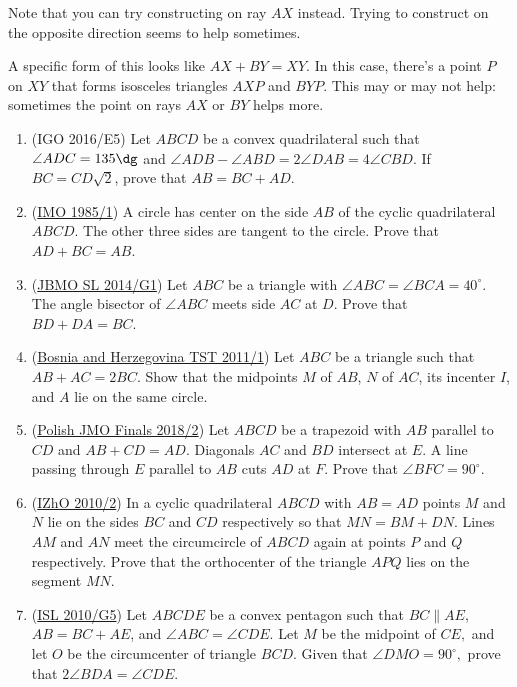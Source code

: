 \documentclass[11pt,paper=letter]{scrartcl}
\begin{document}
Note that you can try constructing on ray $AX$ instead. Trying to construct on the opposite direction seems to help sometimes.

A specific form of this looks like $AX + BY = XY$. In this case, there's a point $P$ on $XY$ that forms isosceles triangles $AXP$ and $BYP$. This may or may not help: sometimes the point on rays $AX$ or $BY$ helps more.

\begin{enumerate}
  \item (IGO 2016/E5) Let $ABCD$ be a convex quadrilateral such that $\angle ADC = 135\dg$ and $\angle ADB - \angle ABD = 2\angle DAB = 4\angle CBD$. If $BC = CD\sqrt2$, prove that $AB = BC + AD$.

  \item (\href{https://aops.com/community/c6h60782}{IMO 1985/1}) A circle has center on the side $AB$ of the cyclic quadrilateral $ABCD$. The other three sides are tangent to the circle. Prove that $AD+BC=AB$.

  \item (\href{https://aops.com/community/c6h1525185}{JBMO SL 2014/G1}) Let $ABC$ be a triangle with $\angle ABC = \angle BCA = 40^{\circ}$. The angle bisector of $\angle ABC$ meets side $AC$ at $D$. Prove that $BD + DA = BC$.

  \item (\href{https://aops.com/community/c6h406786}{Bosnia and Herzegovina TST 2011/1}) Let $ABC$ be a triangle such that $AB + AC = 2BC$. Show that the midpoints $M$ of $AB$, $N$ of $AC$, its incenter $I$, and $A$ lie on the same circle.

  \item (\href{https://aops.com/community/c6h1632776}{Polish JMO Finals 2018/2}) Let $ABCD$ be a trapezoid with $AB$ parallel to $CD$ and $AB + CD = AD$. Diagonals $AC$ and $BD$ intersect at $E$. A line passing through $E$ parallel to $AB$ cuts $AD$ at $F$. Prove that $\angle BFC = 90^{\circ}$. 

  \item (\href{https://aops.com/community/c6h365230}{IZhO 2010/2}) In a cyclic quadrilateral $ABCD$ with $AB=AD$ points $M$ and $N$ lie on the sides $BC$ and $CD$ respectively so that $MN=BM+DN$. Lines $AM$ and $AN$ meet the circumcircle of $ABCD$ again at points $P$ and $Q$ respectively. Prove that the orthocenter of the triangle $APQ$ lies on the segment $MN$.

  \item (\href{https://aops.com/community/c6h418635}{ISL 2010/G5}) Let $ABCDE$ be a convex pentagon such that $BC \parallel AE$, $AB = BC + AE$, and $\angle ABC = \angle CDE.$ Let $M$ be the midpoint of $CE,$ and let $O$ be the circumcenter of triangle $BCD.$ Given that $\angle DMO = 90^{\circ},$ prove that $2 \angle BDA = \angle CDE$. 
\end{enumerate}
\end{document}
